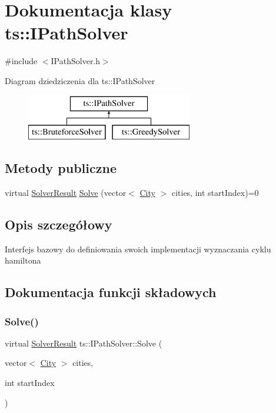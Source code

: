 \hypertarget{classts_1_1_i_path_solver}{}\section{Dokumentacja klasy ts\+:\+:I\+Path\+Solver}
\label{classts_1_1_i_path_solver}


{\ttfamily \#include $<$I\+Path\+Solver.\+h$>$}

Diagram dziedziczenia dla ts\+:\+:I\+Path\+Solver\begin{figure}[H]
\begin{center}
\leavevmode
\includegraphics[height=2.000000cm]{classts_1_1_i_path_solver}
\end{center}
\end{figure}
\subsection*{Metody publiczne}
\begin{DoxyCompactItemize}
\item 
virtual \mbox{\hyperlink{structts_1_1_solver_result}{Solver\+Result}} \mbox{\hyperlink{classts_1_1_i_path_solver_a3d76684ac8ebf47a5edb3af4e0280811}{Solve}} (vector$<$ \mbox{\hyperlink{classts_1_1_city}{City}} $>$ cities, int start\+Index)=0
\end{DoxyCompactItemize}


\subsection{Opis szczegółowy}
Interfejs bazowy do definiowania swoich implementacji wyznaczania cyklu hamiltona 

\subsection{Dokumentacja funkcji składowych}
\mbox{\label{classts_1_1_i_path_solver_a3d76684ac8ebf47a5edb3af4e0280811}} 
\subsubsection{\texorpdfstring{Solve()}{Solve()}}
{\footnotesize\ttfamily virtual \mbox{\hyperlink{structts_1_1_solver_result}{Solver\+Result}} ts\+::\+I\+Path\+Solver\+::\+Solve (\begin{DoxyParamCaption}\item[{vector$<$ \mbox{\hyperlink{classts_1_1_city}{City}} $>$}]{cities,  }\item[{int}]{start\+Index }\end{DoxyParamCaption})\hspace{0.3cm}{\ttfamily [pure virtual]}}

